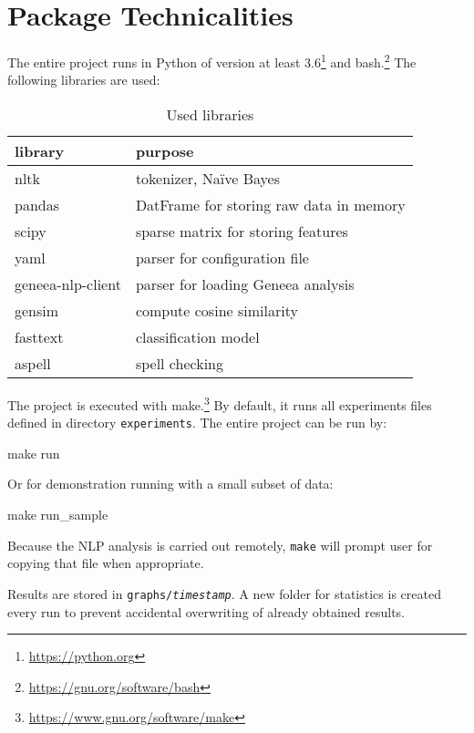 \chapter{Package Technicalities}\label{app:techn}

The entire project runs in Python of version at least 3.6\footnote{\url{https://python.org}} and bash.\footnote{\url{https://gnu.org/software/bash}}
The following libraries are used:

\begin{table}[h]
\centering
\begin{tabular}{ll}
\toprule
\textbf{library} & \textbf{purpose} \\
\midrule

nltk & tokenizer, Na\"{i}ve Bayes\\
pandas & DatFrame for storing raw data in memory\\
scipy & sparse matrix for storing features\\
yaml & parser for configuration file \\
geneea-nlp-client & parser for loading Geneea analysis\\
gensim & compute cosine similarity \\
fasttext & classification model \\
aspell & spell checking \\


\bottomrule
\end{tabular}

\caption{Used libraries}\label{tab:libs}
\end{table}

The project is executed with make.\footnote{\url{https://www.gnu.org/software/make}}
By default, it runs all experiments files defined in directory \texttt{experiments}.
The entire project can be run by:

\begin{code}
make run
\end{code}

Or for demonstration running with a small subset of data:

\begin{code}
make run_sample
\end{code}

Because the NLP analysis is carried out remotely, \texttt{make} will prompt user for copying that file when appropriate.

Results are stored in \texttt{graphs/\textit{timestamp}}.
A new folder for statistics is created every run to prevent accidental overwriting of already obtained results.


